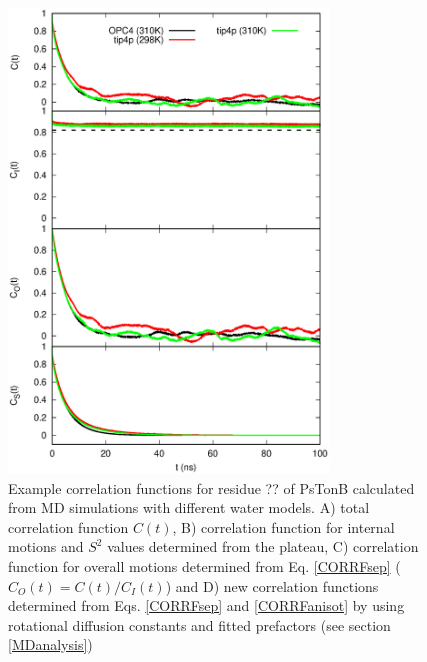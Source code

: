 \documentclass[pre,aps,floatfix,authordate1-4,twocolumn]{revtex4-1}
\begin{document}
\begin{figure}[!h]
  \includegraphics[width=8.5cm]{../Figs/exampleCORRF.eps}%
  \caption{Example correlation functions for residue ?? of PsTonB calculated from MD simulations with different water models.
    A) total correlation function $C(t)$,
    B) correlation function for internal motions and $S^2$ values determined from the plateau,
    C) correlation function for overall motions determined from Eq. \ref{CORRFsep} ($C_O(t)=C(t)/C_I(t)$) and
    D) new correlation functions determined from Eqs. \ref{CORRFsep} and \ref{CORRFanisot} by
    using rotational diffusion constants and fitted prefactors (see section \ref{MDanalysis})
    }\label{exampleCORRF}
\end{figure}
\end{document}
